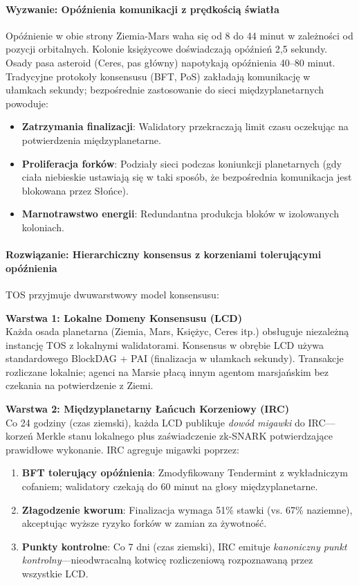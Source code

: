 \documentclass[11pt]{article}
\begin{document}
\paragraph{Wyzwanie: Opóźnienia komunikacji z prędkością światła}
Opóźnienie w obie strony Ziemia-Mars waha się od 8 do 44 minut w zależności od pozycji orbitalnych. Kolonie księżycowe doświadczają opóźnień 2,5 sekundy. Osady pasa asteroid (Ceres, pas główny) napotykają opóźnienia 40--80 minut. Tradycyjne protokoły konsensusu (BFT, PoS) zakładają komunikację w ułamkach sekundy; bezpośrednie zastosowanie do sieci międzyplanetarnych powoduje:
\begin{itemize}[noitemsep]
  \item \textbf{Zatrzymania finalizacji}: Walidatory przekraczają limit czasu oczekując na potwierdzenia międzyplanetarne.
  \item \textbf{Proliferacja forków}: Podziały sieci podczas koniunkcji planetarnych (gdy ciała niebieskie ustawiają się w taki sposób, że bezpośrednia komunikacja jest blokowana przez Słońce).
  \item \textbf{Marnotrawstwo energii}: Redundantna produkcja bloków w izolowanych koloniach.
\end{itemize}

\paragraph{Rozwiązanie: Hierarchiczny konsensus z korzeniami tolerującymi opóźnienia}
TOS przyjmuje dwuwarstwowy model konsensusu:

\textbf{Warstwa 1: Lokalne Domeny Konsensusu (LCD)}\\
Każda osada planetarna (Ziemia, Mars, Księżyc, Ceres itp.) obsługuje niezależną instancję TOS z lokalnymi walidatorami. Konsensus w obrębie LCD używa standardowego BlockDAG + PAI (finalizacja w ułamkach sekundy). Transakcje rozliczane lokalnie; agenci na Marsie płacą innym agentom marsjańskim bez czekania na potwierdzenie z Ziemi.

\textbf{Warstwa 2: Międzyplanetarny Łańcuch Korzeniowy (IRC)}\\
Co 24 godziny (czas ziemski), każda LCD publikuje \emph{dowód migawki} do IRC—korzeń Merkle stanu lokalnego plus zaświadczenie zk-SNARK potwierdzające prawidłowe wykonanie. IRC agreguje migawki poprzez:
\begin{enumerate}[noitemsep]
  \item \textbf{BFT tolerujący opóźnienia}: Zmodyfikowany Tendermint z wykładniczym cofaniem; walidatory czekają do 60 minut na głosy międzyplanetarne.
  \item \textbf{Złagodzenie kworum}: Finalizacja wymaga 51\% stawki (vs. 67\% naziemne), akceptując wyższe ryzyko forków w zamian za żywotność.
  \item \textbf{Punkty kontrolne}: Co 7 dni (czas ziemski), IRC emituje \emph{kanoniczny punkt kontrolny}—nieodwracalną kotwicę rozliczeniową rozpoznawaną przez wszystkie LCD.
\end{enumerate}
\end{document}
